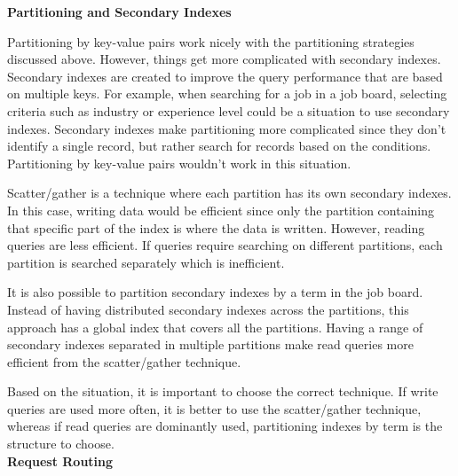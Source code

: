 \noindent \textbf{Partitioning and Secondary Indexes}

Partitioning by key-value pairs work nicely with the partitioning strategies discussed above. However, things get more complicated with secondary indexes.
Secondary indexes are created to improve the query performance that are based on multiple keys. For example, when searching for a job in a job board, selecting criteria such as industry or experience level could be a situation to use secondary indexes.
Secondary indexes make partitioning more complicated since they don’t identify a single record, but rather search for records based on the conditions. Partitioning by key-value pairs wouldn’t work in this situation.

Scatter/gather is a technique where each partition has its own secondary indexes. In this case, writing data would be efficient since only the partition containing that specific part of the index is where the data is written. However, reading queries are less efficient.  If queries require searching on different partitions, each partition is searched separately which is inefficient. 

It is also possible to partition secondary indexes by a term in the job board.
Instead of having distributed secondary indexes across the partitions, 
this approach has a global index that covers all the partitions.
Having a range of secondary indexes separated in multiple partitions make read queries more efficient 
from the scatter/gather technique. 

Based on the situation, it is important to choose the correct technique. 
If write queries are used more often, it is better to use the scatter/gather technique, whereas if read queries are dominantly used,
partitioning indexes by term is the structure to choose. \\

\noindent \textbf{Request Routing}

